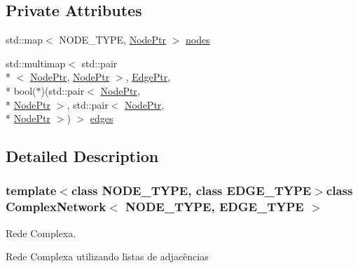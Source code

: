 \subsection*{Private Attributes}
\begin{DoxyCompactItemize}
\item 
std\+::map$<$ N\+O\+D\+E\+\_\+\+T\+Y\+P\+E, \hyperlink{class_complex_network_a1a0d11ddc5f0c146a0e921b58bb5eb3e}{Node\+Ptr} $>$ \hyperlink{class_complex_network_a7f4748e1353c022d91092892977ad0c4}{nodes}
\item 
std\+::multimap$<$ std\+::pair\\*
$<$ \hyperlink{class_complex_network_a1a0d11ddc5f0c146a0e921b58bb5eb3e}{Node\+Ptr}, \hyperlink{class_complex_network_a1a0d11ddc5f0c146a0e921b58bb5eb3e}{Node\+Ptr} $>$, \hyperlink{class_complex_network_af07ec30729e69a40c4c5ac2e98381206}{Edge\+Ptr}, \\*
bool($\ast$)(std\+::pair$<$ \hyperlink{class_complex_network_a1a0d11ddc5f0c146a0e921b58bb5eb3e}{Node\+Ptr}, \\*
\hyperlink{class_complex_network_a1a0d11ddc5f0c146a0e921b58bb5eb3e}{Node\+Ptr} $>$, std\+::pair$<$ \hyperlink{class_complex_network_a1a0d11ddc5f0c146a0e921b58bb5eb3e}{Node\+Ptr}, \\*
\hyperlink{class_complex_network_a1a0d11ddc5f0c146a0e921b58bb5eb3e}{Node\+Ptr} $>$) $>$ \hyperlink{class_complex_network_a4d2f089652d03d9cbca4d77ff04df234}{edges}
\end{DoxyCompactItemize}


\subsection{Detailed Description}
\subsubsection*{template$<$class N\+O\+D\+E\+\_\+\+T\+Y\+P\+E, class E\+D\+G\+E\+\_\+\+T\+Y\+P\+E$>$class Complex\+Network$<$ N\+O\+D\+E\+\_\+\+T\+Y\+P\+E, E\+D\+G\+E\+\_\+\+T\+Y\+P\+E $>$}

Rede Complexa. 

Rede Complexa utilizando listas de adjacências 

